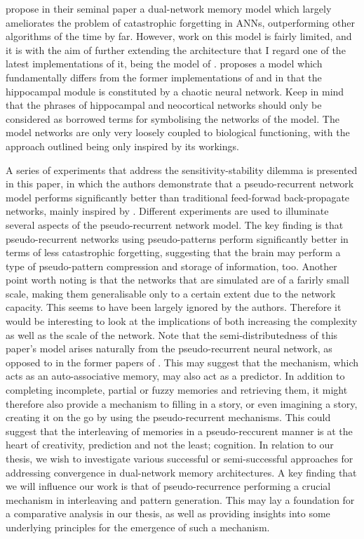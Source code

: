 \cite{McClelland1995} propose in their seminal paper a dual-network memory model which largely ameliorates the problem of catastrophic forgetting in ANNs, outperforming other algorithms of the time by far. However, work on this model is fairly limited, and it is with the aim of further extending the architecture that I regard one of the latest implementations of it, being the model of \cite{Hattori2014}. \cite{Hattori2010} proposes a model which fundamentally differs from the former implementations of \cite{French1997} and \cite{Ans1997} in that the hippocampal module is constituted by a chaotic neural network. Keep in mind that the phrases of hippocampal and neocortical networks should only be considered as borrowed terms for symbolising the networks of the model. The model networks are only very loosely coupled to biological functioning, with the approach outlined being only inspired by its workings.

A series of experiments that address the sensitivity-stability dilemma \citep{Hebb1949} is presented in this paper, in which the authors demonstrate that a pseudo-recurrent network model performs significantly better than traditional feed-forwad back-propagate networks, mainly inspired by \cite{McClelland1995}. Different experiments are used to illuminate several aspects of the pseudo-recurrent network model. The key finding is that pseudo-recurrent networks using pseudo-patterns perform significantly better in terms of less catastrophic forgetting, suggesting that the brain may perform a type of pseudo-pattern compression and storage of information, too. Another point worth noting is that the networks that are simulated are of a farirly small scale, making them generalisable only to a certain extent due to the network capacity. This seems to have been largely ignored by the authors. Therefore it would be interesting to look at the implications of both increasing the complexity as well as the scale of the network. Note that the semi-distributedness of this paper's model arises naturally from the pseudo-recurrent neural network, as opposed to in the former papers of \cite{French1992, French1994}. This may suggest that the mechanism, which acts as an auto-associative memory, may also act as a predictor. In addition to completing incomplete, partial or fuzzy memories and retrieving them, it might therefore also provide a mechanism to filling in a story, or even imagining a story, creating it on the go by using the pseudo-recurrent mechanisms. This could suggest that the interleaving of memories in a pseudo-reccurent manner is at the heart of creativity, prediction and not the least; cognition. In relation to our thesis, we wish to investigate various successful or semi-successful approaches for addressing convergence in dual-network memory architectures. A key finding that we will influence our work is that of pseudo-recurrence performing a crucial mechanism in interleaving and pattern generation. This may lay a foundation for a comparative analysis in our thesis, as well as providing insights into some underlying principles for the emergence of such a mechanism.

